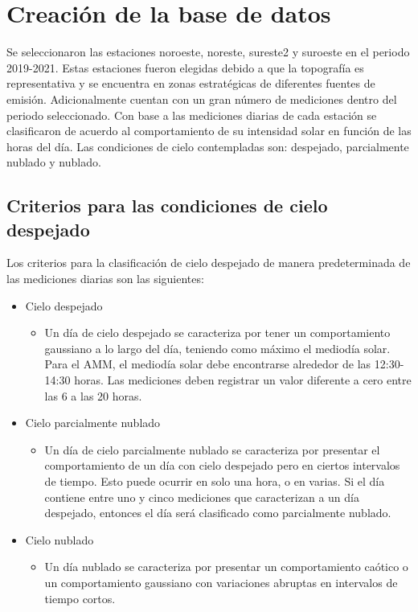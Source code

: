 \section{Creación de la base de datos}
Se seleccionaron las estaciones noroeste, noreste, sureste2 y suroeste en el periodo 2019-2021. Estas estaciones fueron elegidas debido a que la topografía es representativa y se encuentra en zonas estratégicas de diferentes fuentes de emisión. Adicionalmente cuentan con un gran número de mediciones dentro del periodo seleccionado. Con base a las mediciones diarias de cada estación se clasificaron de acuerdo al comportamiento de su intensidad solar en función de las horas del día. Las condiciones de cielo contempladas son: despejado, parcialmente nublado y nublado.
\subsection{Criterios para las condiciones de cielo despejado}
Los criterios para la clasificación de cielo despejado de manera predeterminada de las mediciones diarias son las siguientes:
\begin{itemize}
	\item Cielo despejado
	      \begin{itemize}
		      \item Un día de cielo despejado se caracteriza por tener un comportamiento gaussiano a lo largo del día, teniendo como máximo el mediodía solar. Para el AMM, el mediodía solar debe encontrarse alrededor de las 12:30-14:30 horas. Las mediciones deben registrar un valor diferente a cero entre las 6 a las 20 horas.
	      \end{itemize}
	\item Cielo parcialmente nublado
	      \begin{itemize}
		      \item Un día de cielo parcialmente nublado se caracteriza por presentar el comportamiento de un día con cielo despejado pero en ciertos intervalos de tiempo. Esto puede ocurrir en solo una hora, o en varias. Si el día contiene entre uno y cinco mediciones que caracterizan a un día despejado, entonces el día será clasificado como parcialmente nublado.
	      \end{itemize}
	\item Cielo nublado
	      \begin{itemize}
		      \item Un día nublado se caracteriza por presentar un comportamiento caótico o un comportamiento gaussiano con variaciones abruptas en intervalos de tiempo cortos.
	      \end{itemize}
\end{itemize}
